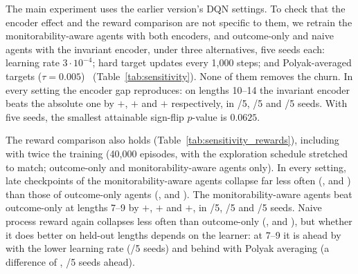 The main experiment uses the earlier version's DQN settings. To check that the encoder effect and the reward comparison are not specific to them, we retrain the monitorability-aware agents with both encoders, and outcome-only and naive agents with the invariant encoder, under three alternatives, five seeds each: learning rate $3{\cdot}10^{-4}$; hard target updates every 1{,}000 steps; and Polyak-averaged targets ($\tau = 0.005$)~\citep{lillicrap2016continuous} (Table~\ref{tab:sensitivity}). None of them removes the churn. In every setting the encoder gap reproduces: on lengths 10--14 the invariant encoder beats the absolute one by $+$, $+$ and $+$ respectively, in /5, /5 and /5 seeds. With five seeds, the smallest attainable sign-flip $p$-value is $0.0625$.

The reward comparison also holds (Table~\ref{tab:sensitivity_rewards}), including with twice the training (40{,}000 episodes, with the exploration schedule stretched to match; outcome-only and monitorability-aware agents only). In every setting, late checkpoints of the monitorability-aware agents collapse far less often (,  and ) than those of outcome-only agents (,  and ). The monitorability-aware agents beat outcome-only at lengths 7--9 by $+$, $+$ and $+$, in /5, /5 and /5 seeds. Naive process reward again collapses less often than outcome-only (,  and ), but whether it does better on held-out lengths depends on the learner: at 7--9 it is ahead by  with the lower learning rate (/5 seeds) and behind with Polyak averaging (a difference of , /5 seeds ahead).

